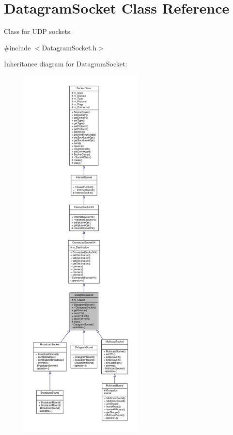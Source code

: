 \hypertarget{classDatagramSocket}{}\section{Datagram\+Socket Class Reference}
\label{classDatagramSocket}


Class for U\+DP sockets.  




{\ttfamily \#include $<$Datagram\+Socket.\+h$>$}



Inheritance diagram for Datagram\+Socket\+:\nopagebreak
\begin{figure}[H]
\begin{center}
\leavevmode
\includegraphics[height=550pt]{classDatagramSocket__inherit__graph}
\end{center}
\end{figure}
